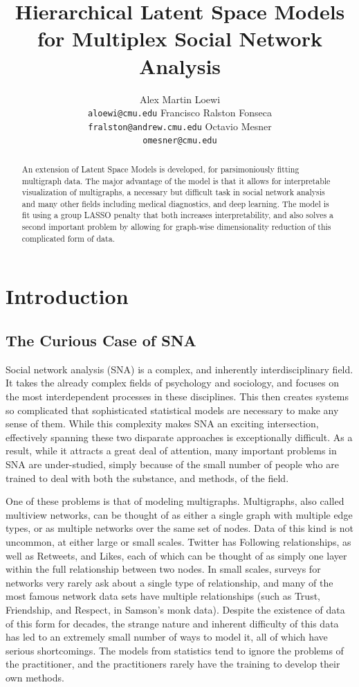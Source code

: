\documentclass{article}
\title{Hierarchical Latent Space Models\\for Multiplex Social Network Analysis}
\author{
  Alex Martin Loewi \\
  \texttt{aloewi@cmu.edu}
  \And
  Francisco Ralston Fonseca\\
  \texttt{fralston@andrew.cmu.edu}
  \And
  Octavio Mesner\\
  \texttt{omesner@cmu.edu}
}
\begin{document}

\maketitle

\begin{abstract}
An extension of Latent Space Models is developed, for parsimoniously fitting multigraph data. The major advantage of the model is that it allows for interpretable visualization of multigraphs, a necessary but difficult task in social network analysis and many other fields including medical diagnostics, and deep learning. The model is fit using a group LASSO penalty that both increases interpretability, and also solves a second important problem by allowing for graph-wise dimensionality reduction of this complicated form of data.%
\end{abstract}

\section{Introduction}

\subsection{The Curious Case of SNA}
Social network analysis (SNA) is a complex, and inherently interdisciplinary field. It takes the already complex fields of psychology and sociology, and focuses on the most interdependent processes in these disciplines. This then creates systems so complicated that sophisticated statistical models are necessary to make any sense of them. While this complexity makes SNA an exciting intersection, effectively spanning these two disparate approaches is exceptionally difficult. As a result, while it attracts a great deal of attention, many important problems in SNA are under-studied, simply because of the small number of people who are trained to deal with both the substance, and methods, of the field.

One of these problems is that of modeling multigraphs. Multigraphs, also called multiview networks, can be thought of as either a single graph with multiple edge types, or as multiple networks over the same set of nodes. Data of this kind is not uncommon, at either large or small scales. Twitter has Following relationships, as well as Retweets, and Likes, each of which can be thought of as simply one layer within the full relationship between two nodes. In small scales, surveys for networks very rarely ask about a single type of relationship, and many of the most famous network data sets have multiple relationships (such as Trust, Friendship, and Respect, in Samson's monk data). Despite the existence of data of this form for decades, the strange nature and inherent difficulty of this data has led to an extremely small number of ways to model it, all of which have serious shortcomings. The models from statistics tend to ignore the problems of the practitioner, and the practitioners rarely have the training to develop their own methods.
\end{document}
